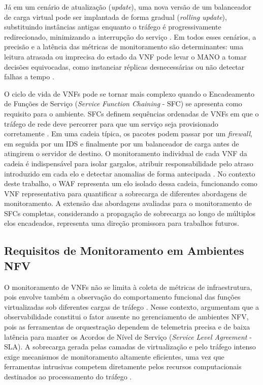 Já em um cenário de atualização (\textit{update}), uma nova versão de um balanceador de carga virtual pode ser implantada de forma gradual (\textit{rolling update}), substituindo instâncias antigas enquanto o tráfego é progressivamente redirecionado, minimizando a interrupção do serviço \cite{repec:wly:intnem:v:31:y:2021:i:5:n:e2068}. Em todos esses cenários, a precisão e a latência das métricas de monitoramento são determinantes: uma leitura atrasada ou imprecisa do estado da VNF pode levar o MANO a tomar decisões equivocadas, como instanciar réplicas desnecessárias ou não detectar falhas a tempo \cite{10.1145/3397022, oliveira_observability_2026}.

O ciclo de vida de VNFs pode se tornar mais complexo quando o Encadeamento de Funções de Serviço (\textit{Service Function Chaining} - SFC) se apresenta como requisito para o ambiente. SFCs definem sequências ordenadas de VNFs em que o tráfego de rede deve percorrer para que um serviço seja provisionado corretamente \cite{rfc7665, 10.1145/3172866}. Em uma cadeia típica, os pacotes podem passar por um \textit{firewall}, em seguida por um IDS e finalmente por um balanceador de carga antes de atingirem o servidor de destino. O monitoramento individual de cada VNF da cadeia é indispensável para isolar gargalos, atribuir responsabilidade pelo atraso introduzido em cada elo e detectar anomalias de forma antecipada \cite{10.23919, oliveira_observability_2026}. No contexto deste trabalho, o WAF representa um elo isolado dessa cadeia, funcionando como VNF representativa para quantificar a sobrecarga de diferentes abordagens de monitoramento. A extensão das abordagens avaliadas para o monitoramento de SFCs completas, considerando a propagação de sobrecarga ao longo de múltiplos elos encadeados, representa uma direção promissora para trabalhos futuros.

\subsection{Requisitos de Monitoramento em Ambientes NFV}
\label{subsec:requisitos_monitoramento}

O monitoramento de VNFs não se limita à coleta de métricas de infraestrutura, pois envolve também a observação do comportamento funcional das funções virtualizadas sob diferentes cargas de tráfego \cite{10.23919}. Nesse contexto,  argumentam que a observabilidade constitui o fator ausente no gerenciamento de ambientes NFV, pois as ferramentas de orquestração dependem de telemetria precisa e de baixa latência para manter os Acordos de Nível de Serviço (\textit{Service Level Agreement} - SLA). A sobrecarga gerada pelas camadas de virtualização e pelo tráfego intenso exige mecanismos de monitoramento altamente eficientes, uma vez que ferramentas intrusivas competem diretamente pelos recursos computacionais destinados ao processamento do tráfego \cite{10.1145/3397022, 10.1109/NOMS47738.2020.9110434}.

